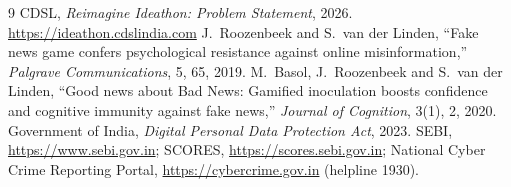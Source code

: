 \documentclass[10pt,twocolumn]{article}
\begin{document}
\begingroup
\footnotesize
\begin{thebibliography}{9}\setlength{\itemsep}{0pt}
 CDSL, \emph{Reimagine Ideathon: Problem Statement}, 2026. \url{https://ideathon.cdslindia.com}
 J.~Roozenbeek and S.~van der Linden, ``Fake news game confers psychological resistance against online
  misinformation,'' \emph{Palgrave Communications}, 5, 65, 2019.
 M.~Basol, J.~Roozenbeek and S.~van der Linden, ``Good news about Bad News: Gamified inoculation boosts confidence
  and cognitive immunity against fake news,'' \emph{Journal of Cognition}, 3(1), 2, 2020.
 Government of India, \emph{Digital Personal Data Protection Act}, 2023.
 SEBI, \url{https://www.sebi.gov.in}; SCORES, \url{https://scores.sebi.gov.in}; National Cyber Crime Reporting
  Portal, \url{https://cybercrime.gov.in} (helpline 1930).
\end{thebibliography}
\endgroup
\end{document}
